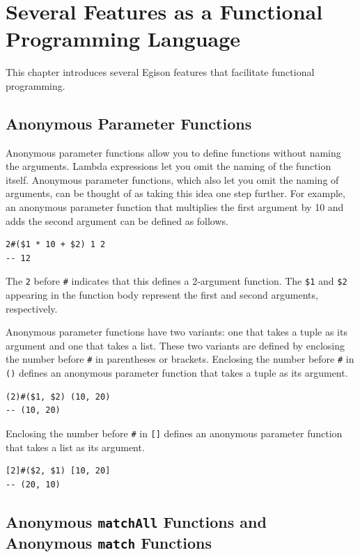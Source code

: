 \chapter{Several Features as a Functional Programming Language}\label{etc}

This chapter introduces several Egison features that facilitate functional programming.

\section{Anonymous Parameter Functions}

Anonymous parameter functions allow you to define functions without naming the arguments.
Lambda expressions let you omit the naming of the function itself.
Anonymous parameter functions, which also let you omit the naming of arguments, can be thought of as taking this idea one step further.
For example, an anonymous parameter function that multiplies the first argument by 10 and adds the second argument can be defined as follows.
\begin{lstlisting}[language=egison,numbers=none]
2#($1 * 10 + $2) 1 2
-- 12
\end{lstlisting}
The \lstinline{2} before \lstinline{#} indicates that this defines a 2-argument function.
The \lstinline{$1} and \lstinline{$2} appearing in the function body represent the first and second arguments, respectively.

Anonymous parameter functions have two variants: one that takes a tuple as its argument and one that takes a list.
These two variants are defined by enclosing the number before \lstinline{#} in parentheses or brackets.
Enclosing the number before \lstinline{#} in \lstinline{()} defines an anonymous parameter function that takes a tuple as its argument.
\begin{lstlisting}[language=egison,numbers=none]
(2)#($1, $2) (10, 20)
-- (10, 20)
\end{lstlisting}
Enclosing the number before \lstinline{#} in \lstinline{[]} defines an anonymous parameter function that takes a list as its argument.
\begin{lstlisting}[language=egison,numbers=none]
[2]#($2, $1) [10, 20]
-- (20, 10)
\end{lstlisting}

\section{Anonymous \texttt{matchAll} Functions and Anonymous \texttt{match} Functions}

